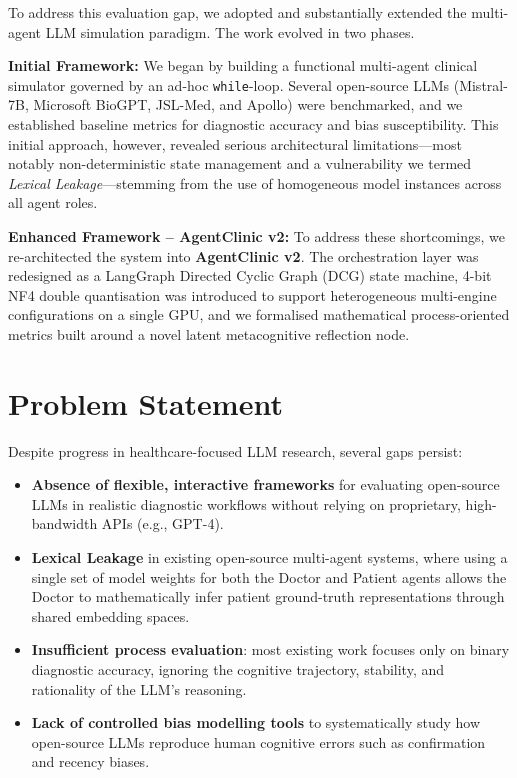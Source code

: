 To address this evaluation gap, we adopted and substantially extended the multi-agent LLM simulation paradigm. The work evolved in two phases.

\textbf{Initial Framework:} We began by building a functional multi-agent clinical simulator governed by an ad-hoc \texttt{while}-loop. Several open-source LLMs (Mistral-7B, Microsoft BioGPT, JSL-Med, and Apollo) were benchmarked, and we established baseline metrics for diagnostic accuracy and bias susceptibility. This initial approach, however, revealed serious architectural limitations—most notably non-deterministic state management and a vulnerability we termed \textit{Lexical Leakage}—stemming from the use of homogeneous model instances across all agent roles.

\textbf{Enhanced Framework -- AgentClinic v2:} To address these shortcomings, we re-architected the system into \textbf{AgentClinic v2}. The orchestration layer was redesigned as a LangGraph Directed Cyclic Graph (DCG) state machine, 4-bit NF4 double quantisation was introduced to support heterogeneous multi-engine configurations on a single GPU, and we formalised mathematical process-oriented metrics built around a novel latent metacognitive reflection node.

\section{Problem Statement}

Despite progress in healthcare-focused LLM research, several gaps persist:
\begin{itemize}
    \item \textbf{Absence of flexible, interactive frameworks} for evaluating open-source LLMs in realistic diagnostic workflows without relying on proprietary, high-bandwidth APIs (e.g., GPT-4).
    \item \textbf{Lexical Leakage} in existing open-source multi-agent systems, where using a single set of model weights for both the Doctor and Patient agents allows the Doctor to mathematically infer patient ground-truth representations through shared embedding spaces.
    \item \textbf{Insufficient process evaluation}: most existing work focuses only on binary diagnostic accuracy, ignoring the cognitive trajectory, stability, and rationality of the LLM's reasoning.
    \item \textbf{Lack of controlled bias modelling tools} to systematically study how open-source LLMs reproduce human cognitive errors such as confirmation and recency biases.
\end{itemize}

